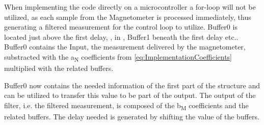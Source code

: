 When implementing the code directly on a microcontroller a for-loop will not be utilized, as each sample from the Magnetometer is processed immediately, thus generating a filtered measurement for the control loop to utilize.
Buffer0 is located just above the first delay, \si{}, in , Buffer1 beneath the first delay etc.. Buffer0 contains the Input, the measurement delivered by the magnetometer, substracted with the \si{a_N} coefficients from \eqref{eq:ImplementationCoefficients} multiplied with the related buffers.

Buffer0 now contains the needed information of the first part of the structure and can be utilized to transfer this value to be part of the output. The output of the filter, i.e. the filtered measurement, is composed of the \si{b_M} coefficients and the related buffers. The delay needed is generated by shifting the value of the buffers.

